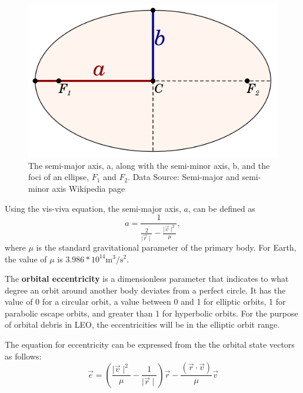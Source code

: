 \documentclass[a4paper, 12pt]{article}
\newcommand{\lindex}[1]{%
	\lowercase{\def\temp{#1}}%
	\expandafter\index\expandafter{\temp}%
}
\newcommand{\boldindex}[1]{%
	\textbf{#1}\lindex{#1}%
}
\begin{document}
\begin{figure}[h]
	\centering
	\includegraphics[scale=0.35]{semi-major_and_minor_axes}
	\caption{The semi-major axis, a, along with the semi-minor axis, b, and the foci of an ellipse, $F_1$ and $F_2$. Data Source: Semi-major and semi-minor axis Wikipedia page}
\end{figure}

Using the vis-viva equation, the semi-major axis, $a$, can be defined as
\begin{equation}
a = \frac{1}{\frac{2}{\mid \vec{r} \mid} - \frac{\mid \vec{v} \mid^2 }{\mu}},
\end{equation}
\noindent where $\mu$ is the standard gravitational parameter of the primary body. For Earth, the value of $\mu$ is $3.986 *10^{14}\text{m}^3/\text{s}^2$.

The \boldindex{orbital eccentricity} is a dimensionless parameter that indicates to what degree an orbit around another body deviates from a perfect circle. It has the value of 0 for a circular orbit, a value between 0 and 1 for elliptic orbits, 1 for parabolic escape orbits, and greater than 1 for hyperbolic orbits. For the purpose of orbital debris in LEO, the eccentricities will be in the elliptic orbit range.

The equation for eccentricity can be expressed from the the orbital state vectors as follows:
\begin{equation}
\vec{e} = \left(\frac{\mid \vec{v} \mid^2}{\mu} - \frac{1}{\mid \vec{r} \mid}\right)\vec{r} - \frac{(\vec{r} \cdot \vec{v})}{\mu}\vec{v}
\end{equation}
\end{document}
